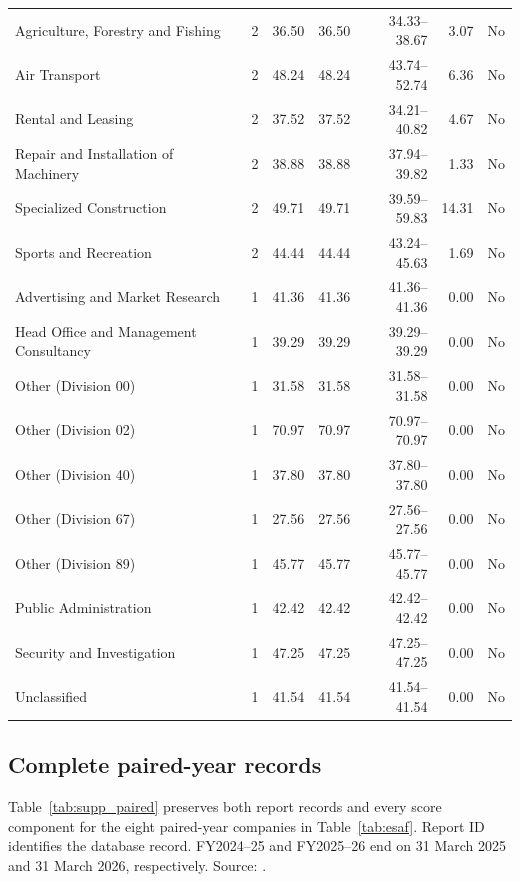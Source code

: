 {\begin{longtable}{@{}L{6.0cm}rrrrrr@{}}
Agriculture, Forestry and Fishing & 2 & 36.50 & 36.50 & 34.33--38.67 & 3.07 & No \\
Air Transport & 2 & 48.24 & 48.24 & 43.74--52.74 & 6.36 & No \\
Rental and Leasing & 2 & 37.52 & 37.52 & 34.21--40.82 & 4.67 & No \\
Repair and Installation of Machinery & 2 & 38.88 & 38.88 & 37.94--39.82 & 1.33 & No \\
Specialized Construction & 2 & 49.71 & 49.71 & 39.59--59.83 & 14.31 & No \\
Sports and Recreation & 2 & 44.44 & 44.44 & 43.24--45.63 & 1.69 & No \\
Advertising and Market Research & 1 & 41.36 & 41.36 & 41.36--41.36 & 0.00 & No \\
Head Office and Management Consultancy & 1 & 39.29 & 39.29 & 39.29--39.29 & 0.00 & No \\
Other (Division 00) & 1 & 31.58 & 31.58 & 31.58--31.58 & 0.00 & No \\
Other (Division 02) & 1 & 70.97 & 70.97 & 70.97--70.97 & 0.00 & No \\
Other (Division 40) & 1 & 37.80 & 37.80 & 37.80--37.80 & 0.00 & No \\
Other (Division 67) & 1 & 27.56 & 27.56 & 27.56--27.56 & 0.00 & No \\
Other (Division 89) & 1 & 45.77 & 45.77 & 45.77--45.77 & 0.00 & No \\
Public Administration & 1 & 42.42 & 42.42 & 42.42--42.42 & 0.00 & No \\
Security and Investigation & 1 & 47.25 & 47.25 & 47.25--47.25 & 0.00 & No \\
Unclassified & 1 & 41.54 & 41.54 & 41.54--41.54 & 0.00 & No \\
\end{longtable}}

\clearpage
\subsection{Complete paired-year records}

Table~\ref{tab:supp_paired} preserves both report records and every score component for the eight paired-year companies in Table~\ref{tab:esaf}. Report ID identifies the database record. FY2024--25 and FY2025--26 end on 31 March 2025 and 31 March 2026, respectively. Source: .

